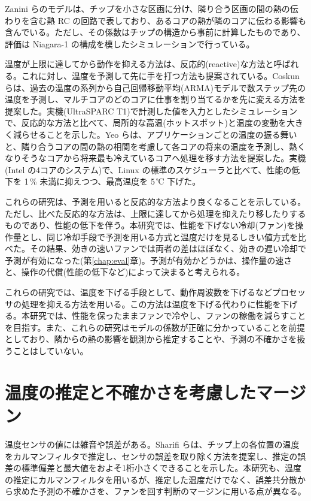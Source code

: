 Zanini らのモデルは、チップを小さな区画に分け、隣り合う区画の間の熱の伝わりを含む熱 RC の回路で表しており、あるコアの熱が隣のコアに伝わる影響も含んでいる。ただし、その係数はチップの構造から事前に計算したものであり、評価は Niagara-1 の構成を模したシミュレーションで行っている。

温度が上限に達してから動作を抑える方法は、反応的(reactive)な方法と呼ばれる。これに対し、温度を予測して先に手を打つ方法も提案されている。Coskun ら\cite{coskun2008proactive}は、過去の温度の系列から自己回帰移動平均(ARMA)モデルで数ステップ先の温度を予測し、マルチコアのどのコアに仕事を割り当てるかを先に変える方法を提案した。実機(UltraSPARC T1)で計測した値を入力としたシミュレーションで、反応的な方法と比べて、局所的な高温(ホットスポット)と温度の変動を大きく減らせることを示した。Yeo ら\cite{yeo2008pdtm}は、アプリケーションごとの温度の振る舞いと、隣り合うコアの間の熱の相関を考慮して各コアの将来の温度を予測し、熱くなりそうなコアから将来最も冷えているコアへ処理を移す方法を提案した。実機(Intel の4コアのシステム)で、Linux の標準のスケジューラと比べて、性能の低下を 1\,\% 未満に抑えつつ、最高温度を 5\,℃ 下げた。

これらの研究は、予測を用いると反応的な方法より良くなることを示している。ただし、比べた反応的な方法は、上限に達してから処理を抑えたり移したりするものであり、性能の低下を伴う。本研究では、性能を下げない冷却(ファン)を操作量とし、同じ冷却手段で予測を用いる方式と温度だけを見るしきい値方式を比べた。その結果、効きの速いファンでは両者の差はほぼなく、効きの遅い冷却で予測が有効になった(第\ref{chap:eval}章)。予測が有効かどうかは、操作量の速さと、操作の代償(性能の低下など)によって決まると考えられる。

これらの研究では、温度を下げる手段として、動作周波数を下げるなどプロセッサの処理を抑える方法を用いる。この方法は温度を下げる代わりに性能を下げる。本研究では、性能を保ったままファンで冷やし、ファンの稼働を減らすことを目指す。また、これらの研究はモデルの係数が正確に分かっていることを前提としており、隣からの熱の影響を観測から推定することや、予測の不確かさを扱うことはしていない。

\section{温度の推定と不確かさを考慮したマージン}\label{sec:rel-margin}
温度センサの値には雑音や誤差がある。Sharifi ら\cite{sharifi2008estimation}は、チップ上の各位置の温度をカルマンフィルタで推定し、センサの誤差を取り除く方法を提案し、推定の誤差の標準偏差と最大値をおよそ1桁小さくできることを示した。本研究も、温度の推定にカルマンフィルタを用いるが、推定した温度だけでなく、誤差共分散から求めた予測の不確かさを、ファンを回す判断のマージンに用いる点が異なる。

